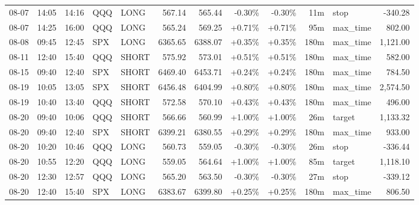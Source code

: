 \documentclass[11pt,a4paper,twoside]{article}
\begin{document}
\begin{center}
\begin{longtable}{>{\color{txtmain}}l l l l l r r r r r >{\color{txtmain}}l r}
08-07 & 14:05 & 14:16 & QQQ & LONG & 567.14 & 565.44 & \textcolor{lossred}{-0.30\%} & \textcolor{lossred}{-0.30\%} & 11m & stop & \textcolor{lossred}{-340.28} \\
08-07 & 14:25 & 16:00 & QQQ & LONG & 565.24 & 569.25 & \textcolor{wingreen}{+0.71\%} & \textcolor{wingreen}{+0.71\%} & 95m & max\_time & \textcolor{wingreen}{802.00} \\
08-08 & 09:45 & 12:45 & SPX & LONG & 6365.65 & 6388.07 & \textcolor{wingreen}{+0.35\%} & \textcolor{wingreen}{+0.35\%} & 180m & max\_time & \textcolor{wingreen}{1,121.00} \\
08-11 & 12:40 & 15:40 & QQQ & SHORT & 575.92 & 573.01 & \textcolor{wingreen}{+0.51\%} & \textcolor{wingreen}{+0.51\%} & 180m & max\_time & \textcolor{wingreen}{582.00} \\
08-15 & 09:40 & 12:40 & SPX & SHORT & 6469.40 & 6453.71 & \textcolor{wingreen}{+0.24\%} & \textcolor{wingreen}{+0.24\%} & 180m & max\_time & \textcolor{wingreen}{784.50} \\
08-19 & 10:05 & 13:05 & SPX & SHORT & 6456.48 & 6404.99 & \textcolor{wingreen}{+0.80\%} & \textcolor{wingreen}{+0.80\%} & 180m & max\_time & \textcolor{wingreen}{2,574.50} \\
08-19 & 10:40 & 13:40 & QQQ & SHORT & 572.58 & 570.10 & \textcolor{wingreen}{+0.43\%} & \textcolor{wingreen}{+0.43\%} & 180m & max\_time & \textcolor{wingreen}{496.00} \\
08-20 & 09:40 & 10:06 & QQQ & SHORT & 566.66 & 560.99 & \textcolor{wingreen}{+1.00\%} & \textcolor{wingreen}{+1.00\%} & 26m & target & \textcolor{wingreen}{1,133.32} \\
08-20 & 09:40 & 12:40 & SPX & SHORT & 6399.21 & 6380.55 & \textcolor{wingreen}{+0.29\%} & \textcolor{wingreen}{+0.29\%} & 180m & max\_time & \textcolor{wingreen}{933.00} \\
08-20 & 10:20 & 10:46 & QQQ & LONG & 560.73 & 559.05 & \textcolor{lossred}{-0.30\%} & \textcolor{lossred}{-0.30\%} & 26m & stop & \textcolor{lossred}{-336.44} \\
08-20 & 10:55 & 12:20 & QQQ & LONG & 559.05 & 564.64 & \textcolor{wingreen}{+1.00\%} & \textcolor{wingreen}{+1.00\%} & 85m & target & \textcolor{wingreen}{1,118.10} \\
08-20 & 12:30 & 12:57 & QQQ & LONG & 565.20 & 563.50 & \textcolor{lossred}{-0.30\%} & \textcolor{lossred}{-0.30\%} & 27m & stop & \textcolor{lossred}{-339.12} \\
08-20 & 12:40 & 15:40 & SPX & LONG & 6383.67 & 6399.80 & \textcolor{wingreen}{+0.25\%} & \textcolor{wingreen}{+0.25\%} & 180m & max\_time & \textcolor{wingreen}{806.50} \\

\end{longtable}
\end{center}
\end{document}
